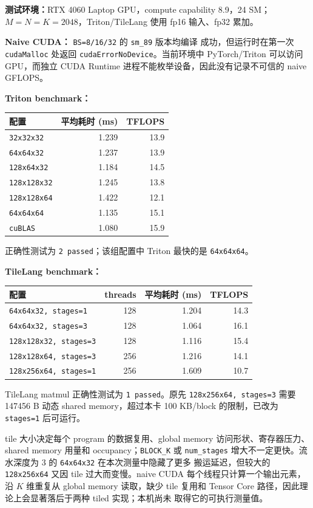 \documentclass[11pt,a4paper,fontset=fandol]{ctexart}
\begin{document}
\begin{answer}
\textbf{测试环境：}RTX 4060 Laptop GPU，compute capability 8.9，24 SM；
$M=N=K=2048$，Triton/TileLang 使用 fp16 输入、fp32 累加。

\textbf{Naive CUDA：} \texttt{BS=8/16/32} 的 \texttt{sm\_89} 版本均编译
成功，但运行时在第一次 \texttt{cudaMalloc} 处返回
\texttt{cudaErrorNoDevice}。当前环境中 PyTorch/Triton 可以访问 GPU，而独立
CUDA Runtime 进程不能枚举设备，因此没有记录不可信的 naive GFLOPS。

\textbf{Triton benchmark：}
\begin{center}\small
\begin{tabular}{@{}lrr@{}}
\toprule
配置 & 平均耗时 (ms) & TFLOPS \\
\midrule
\texttt{32x32x32} & 1.239 & 13.9 \\
\texttt{64x64x32} & 1.237 & 13.9 \\
\texttt{128x64x32} & 1.184 & 14.5 \\
\texttt{128x128x32} & 1.245 & 13.8 \\
\texttt{128x128x64} & 1.422 & 12.1 \\
\texttt{64x64x64} & 1.135 & 15.1 \\
\texttt{cuBLAS} & 1.080 & 15.9 \\
\bottomrule
\end{tabular}
\end{center}
正确性测试为 \texttt{2 passed}；该组配置中 Triton 最快的是
\texttt{64x64x64}。

\textbf{TileLang benchmark：}
\begin{center}\small
\begin{tabular}{@{}lrrr@{}}
\toprule
配置 & threads & 平均耗时 (ms) & TFLOPS \\
\midrule
\texttt{64x64x32, stages=1} & 128 & 1.204 & 14.3 \\
\texttt{64x64x32, stages=3} & 128 & 1.064 & 16.1 \\
\texttt{128x128x32, stages=3} & 128 & 1.116 & 15.4 \\
\texttt{128x128x64, stages=3} & 256 & 1.216 & 14.1 \\
\texttt{128x256x64, stages=1} & 256 & 1.609 & 10.7 \\
\bottomrule
\end{tabular}
\end{center}
TileLang matmul 正确性测试为 \texttt{1 passed}。原先
\texttt{128x256x64, stages=3} 需要 147456 B 动态 shared memory，超过本卡
100 KB/block 的限制，已改为 \texttt{stages=1} 后可运行。

tile 大小决定每个 program 的数据复用、global memory 访问形状、寄存器压力、
shared memory 用量和 occupancy；\texttt{BLOCK\_K} 或 \texttt{num\_stages}
增大不一定更快。流水深度为 3 的 \texttt{64x64x32} 在本次测量中隐藏了更多
搬运延迟，但较大的 \texttt{128x256x64} 又因 tile 过大而变慢。naive CUDA
每个线程只计算一个输出元素，沿 $K$ 维重复从 global memory 读取，缺少 tile
复用和 Tensor Core 路径，因此理论上会显著落后于两种 tiled 实现；本机尚未
取得它的可执行测量值。
\end{answer}
\end{document}
